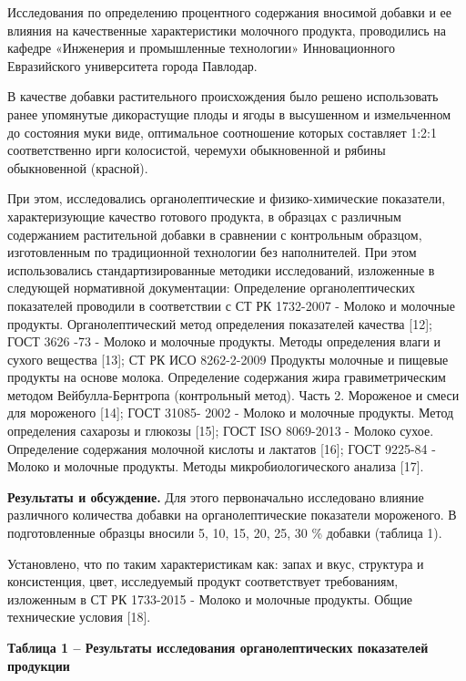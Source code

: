 {{Исследования по определению процентного содержания вносимой добавки и ее
влияния на качественные характеристики молочного продукта, проводились
на кафедре «Инженерия и промышленные технологии» Инновационного
Евразийского университета города Павлодар.

В качестве добавки растительного происхождения было решено использовать
ранее упомянутые дикорастущие плоды и ягоды в высушенном и измельченном
до состояния муки виде, оптимальное соотношение которых составляет 1:2:1
соответственно ирги колосистой, черемухи обыкновенной и рябины
обыкновенной (красной).

При этом, исследовались органолептические и физико-химические
показатели, характеризующие качество готового продукта, в образцах с
различным содержанием растительной добавки в сравнении с контрольным
образцом, изготовленным по традиционной технологии без наполнителей. При
этом использовались стандартизированные методики исследований,
изложенные в следующей нормативной документации: Определение
органолептических показателей проводили в соответствии с СТ РК 1732-2007
- Молоко и молочные продукты. Органолептический метод определения
показателей качества {[}12{]}; ГОСТ 3626 -73 - Молоко и молочные
продукты. Методы определения влаги и сухого вещества {[}13{]}; СТ РК ИСО
8262-2-2009 Продукты молочные и пищевые продукты на основе молока.
Определение содержания жира гравиметрическим методом Вейбулла-Бернтропа
(контрольный метод). Часть 2. Мороженое и смеси для мороженого {[}14{]};
ГОСТ 31085- 2002 - Молоко и молочные продукты. Метод определения
сахарозы и глюкозы {[}15{]}; ГОСТ ISO 8069-2013 - Молоко сухое.
Определение содержания молочной кислоты и лактатов {[}16{]}; ГОСТ
9225-84 - Молоко и молочные продукты. Методы микробиологического анализа
{[}17{]}.

{\bfseries Результаты и обсуждение.} Для этого первоначально исследовано
влияние различного количества добавки на органолептические показатели
мороженого. В подготовленные образцы вносили 5, 10, 15, 20, 25, 30 \%
добавки (таблица 1).

Установлено, что по таким характеристикам как: запах и вкус, структура и
консистенция, цвет, исследуемый продукт соответствует требованиям,
изложенным в СТ РК 1733-2015 - Молоко и молочные продукты. Общие
технические условия {[}18{]}.

{\bfseries Таблица 1 -- Результаты исследования органолептических
показателей продукции}

}}
